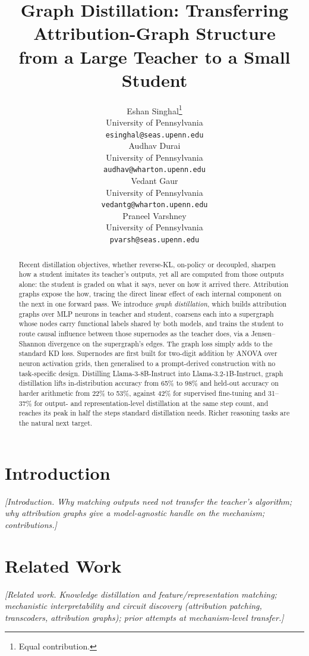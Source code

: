 \documentclass{article}
\title{Graph Distillation: Transferring Attribution-Graph Structure\\from a Large Teacher to a Small Student}
\author{%
  Eshan Singhal\thanks{Equal contribution.} \\
  University of Pennsylvania \\
  \texttt{esinghal@seas.upenn.edu} \\
  \And
  Audhav Durai\footnotemark[1] \\
  University of Pennsylvania \\
  \texttt{audhav@wharton.upenn.edu} \\
  \And
  Vedant Gaur\footnotemark[1] \\
  University of Pennsylvania \\
  \texttt{vedantg@wharton.upenn.edu} \\
  \And
  Praneel Varshney\footnotemark[1] \\
  University of Pennsylvania \\
  \texttt{pvarsh@seas.upenn.edu} \\
}
\newcommand{\todosec}[1]{{\color{Gray}\emph{[#1]}}}
\begin{document}
\maketitle

\begin{abstract}
Recent distillation objectives, whether reverse-KL, on-policy or decoupled, sharpen how a
student imitates its teacher's outputs, yet all are computed from those outputs alone: the
student is graded on what it says, never on how it arrived there. Attribution graphs expose the
how, tracing the direct linear effect of each internal component on the next in one forward pass. We introduce \emph{graph distillation}, which builds attribution graphs over
MLP neurons in teacher and student, coarsens each into a supergraph whose nodes carry functional
labels shared by both models, and trains the student to route causal influence between those
supernodes as the teacher does, via a Jensen--Shannon divergence on the supergraph's edges. The
graph loss simply adds to the standard KD loss. Supernodes are first
built for two-digit addition by ANOVA over neuron activation grids, then generalised to a
prompt-derived construction with no task-specific design. Distilling Llama-3-8B-Instruct into
Llama-3.2-1B-Instruct, graph distillation lifts in-distribution accuracy from 65\% to 98\% and
held-out accuracy on harder arithmetic from 22\% to 53\%, against 42\% for supervised fine-tuning
and 31--37\% for output- and representation-level distillation at the same step count, and reaches
its peak in half the steps standard distillation needs. Richer reasoning tasks are the natural next
target.
\end{abstract}

\section{Introduction}
\label{sec:intro}

\todosec{Introduction. Why matching outputs need not transfer the teacher's algorithm;
why attribution graphs give a model-agnostic handle on the mechanism; contributions.}

\section{Related Work}
\label{sec:related}

\todosec{Related work. Knowledge distillation and feature/representation matching;
mechanistic interpretability and circuit discovery (attribution patching, transcoders,
attribution graphs); prior attempts at mechanism-level transfer.}
\end{document}
